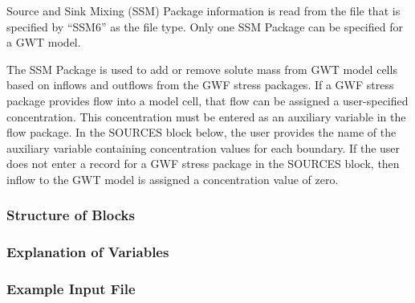 Source and Sink Mixing (SSM) Package information is read from the file that is specified by ``SSM6'' as the file type.  Only one SSM Package can be specified for a GWT model.  

The SSM Package is used to add or remove solute mass from GWT model cells based on inflows and outflows from the GWF stress packages.  If a GWF stress package provides flow into a model cell, that flow can be assigned a user-specified concentration.  This concentration must be entered as an auxiliary variable in the flow package.  In the SOURCES block below, the user provides the name of the auxiliary variable containing concentration values for each boundary.  If the user does not enter a record for a GWF stress package in the SOURCES block, then inflow to the GWT model is assigned a concentration value of zero.

\vspace{5mm}
\subsubsection{Structure of Blocks}



\vspace{5mm}
\subsubsection{Explanation of Variables}
\begin{description}

\end{description}

\vspace{5mm}
\subsubsection{Example Input File}


